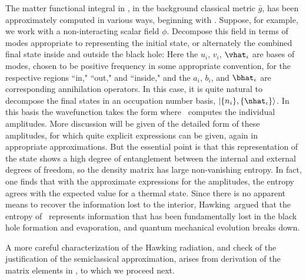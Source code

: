The matter functional integral in \approxint, in the background classical metric $\bar g$, has been approximately computed in various ways, beginning with \Hawkevap.  Suppose, for example, we work with a non-interacting scalar field $\phi$.  Decompose this field in terms of modes appropriate to representing the initial state, or alternately the combined final state inside and outside the black hole:
%
\eqn{}
%
Here the $u_i$, $v_i$, $\vhat_\iota$ are bases of modes, chosen to be positive frequency in some appropriate convention, for the respective regions ``in," ``out," and ``inside," and the $a_i$, $b_i$, and $\bhat_\iota$ are corresponding annihilation operators.  In this case, it is quite natural to decompose the final states in an occupation number basis, $|\{n_i\},\{\nhat_\iota\}\rangle$.  In this basis the wavefunction takes the form
%
\eqn{}
%
where \approxint\ computes the individual amplitudes.  More discussion will be given of the detailed form of these amplitudes, for which quite explicit expressions can be given, again in appropriate approximations.  But the essential point is that this representation of the state shows a high degree of entanglement between the internal and external degrees of freedom, so the density matrix
%
\eqn{}
%
has large non-vanishing entropy.  In fact, one finds that with the approximate expressions for the amplitudes, the entropy agrees with the expected value for a thermal state.  Since there is no apparent means to recover the information lost to the interior, Hawking\Hawkunc\ argued that the entropy of \densocc\ represents information that has been fundamentally lost in the black hole formation and evaporation, and quantum mechanical evolution breaks down.



A more careful characterization of the Hawking radiation, and check of the justification of the semiclassical approximation, arises from derivation of the matrix elements in \psiapprox, to which we proceed next.  




